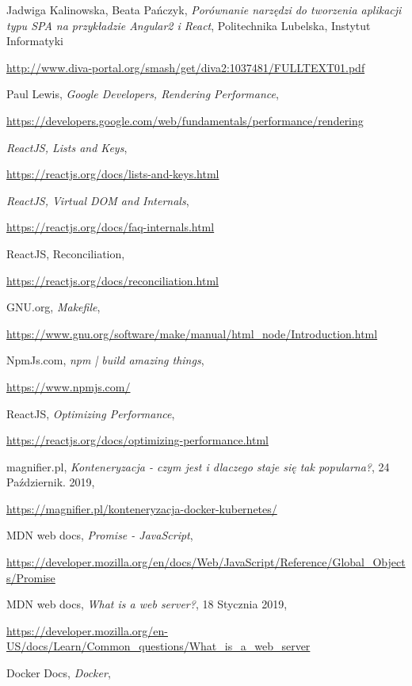 \begin{thebibliography}{99}
Jadwiga Kalinowska, Beata Pańczyk,
\emph{Porównanie narzędzi do tworzenia aplikacji typu SPA na przykładzie Angular2 i React},
Politechnika Lubelska, Instytut Informatyki

\url{http://www.diva-portal.org/smash/get/diva2:1037481/FULLTEXT01.pdf}

Paul Lewis,
\emph{Google Developers, Rendering Performance},

\url{https://developers.google.com/web/fundamentals/performance/rendering}

 \emph{ReactJS,  Lists and Keys},

\url{https://reactjs.org/docs/lists-and-keys.html}

\emph{ReactJS, Virtual DOM and Internals}, 

\url{https://reactjs.org/docs/faq-internals.html}

ReactJS, Reconciliation,

\url{https://reactjs.org/docs/reconciliation.html}

GNU.org, 
\emph{Makefile},

\url{https://www.gnu.org/software/make/manual/html_node/Introduction.html}

 NpmJs.com,
\emph{npm | build amazing things},

\url{https://www.npmjs.com/}

 ReactJS,
\emph{Optimizing Performance},

\url{https://reactjs.org/docs/optimizing-performance.html}

magnifier.pl,
\emph{Konteneryzacja - czym jest i dlaczego staje się tak popularna?},
24 Październik. 2019,

\url{https://magnifier.pl/konteneryzacja-docker-kubernetes/}

MDN web docs,
\emph{Promise - JavaScript},

\url{https://developer.mozilla.org/en/docs/Web/JavaScript/Reference/Global_Objects/Promise}

MDN web docs,
\emph{What is a web server?},
18 Stycznia 2019,

\url{https://developer.mozilla.org/en-US/docs/Learn/Common_questions/What_is_a_web_server}

Docker Docs,
\emph{Docker},


\end{thebibliography}
